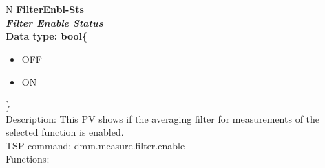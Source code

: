 \documentclass[openany]{article}
\begin{document}
		\begin{tabular}{N}
			\hline
			\bfseries FilterEnbl-Sts\label{pv:filterenbl-sts} \\ \hline
			\emph{Filter Enable Status} \\
			Data type: bool\{\begin{itemize}[noitemsep]
				\item[] OFF
				\item[] ON
			\end{itemize}\} \\
			Description: This PV shows if the averaging filter for measurements of the selected function is enabled. \\
			TSP command: dmm.measure.filter.enable \\
			Functions: \\
			\arrayrulecolor{\FuncTableBorderColor}

		\end{tabular}
\end{document}
